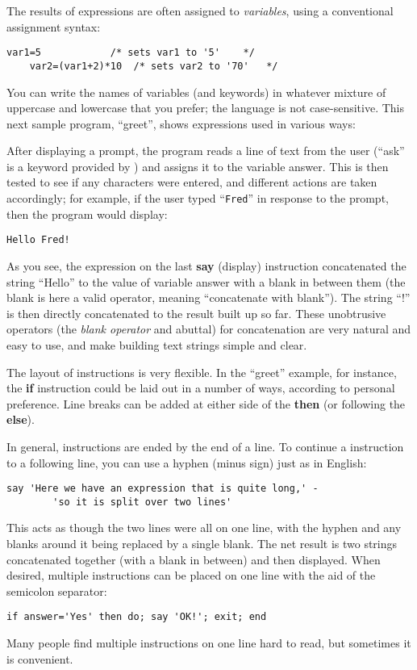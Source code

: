 The results of expressions are often assigned to \emph{variables}, using a
conventional assignment syntax:
\begin{lstlisting}[label=assignment,caption=Assignment]
    var1=5            /* sets var1 to '5'    */
    var2=(var1+2)*10  /* sets var2 to '70'   */
\end{lstlisting}
You can write the names of variables (and keywords) in whatever mixture of uppercase and lowercase that you prefer; the language is not case-sensitive.
This next sample program, “greet”, shows expressions used in various
ways:

After displaying a prompt, the program reads a line of text from the
user (“ask” is a keyword provided by \nr{}) and assigns it to the
variable answer. This is then tested to see if any characters were
entered, and different actions are taken accordingly; for example, if
the user typed “\texttt{Fred}” in response to the prompt, then the program
would display:
\begin{lstlisting}
Hello Fred!
\end{lstlisting}
As you see, the expression on the last \textbf{say} (display) instruction
concatenated the string “Hello” to the value of variable answer with a
blank in between them (the blank is here a valid operator, meaning
“concatenate with blank”). The string “!” is then directly
concatenated to the result built up so far. These unobtrusive
operators (the \emph{blank operator} and abuttal) for concatenation are very
natural and easy to use, and make building text strings simple and
clear.

The layout of instructions is very flexible. In the “greet” example,
for instance, the \textbf{if} instruction could be laid out in a number of
ways, according to personal preference. Line breaks can be added at
either side of the \textbf{then} (or following the \textbf{else}).

In general, instructions are ended by the end of a line. To continue a
instruction to a following line, you can use a hyphen (minus sign)
just as in English:
\begin{lstlisting}[label=continue,caption=Continuation]
    say 'Here we have an expression that is quite long,' -
        'so it is split over two lines'
\end{lstlisting}
This acts as though the two lines were all on one line, with the hyphen and any blanks around it being replaced by a single blank. The net result is two strings concatenated together (with a blank in between) and then displayed.
When desired, multiple instructions can be placed on one line with the
aid of the semicolon separator:
\begin{lstlisting}[label=multiple,caption=Multiple Instructions]
    if answer='Yes' then do; say 'OK!'; exit; end
\end{lstlisting}
Many people find multiple instructions on one line hard to read, but sometimes it is convenient.
